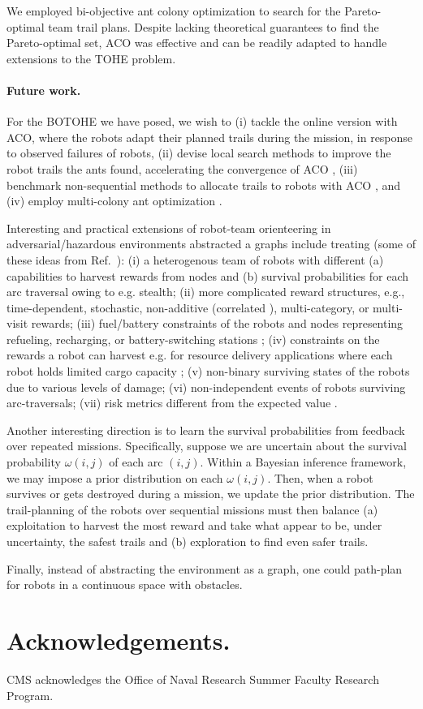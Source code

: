 \documentclass[11pt, oneside]{article}
\begin{document}
We employed bi-objective ant colony optimization to search for the Pareto-optimal team trail plans. Despite lacking theoretical guarantees to find the Pareto-optimal set, ACO was effective and can be readily adapted to handle extensions to the TOHE problem.

\paragraph{Future work.}
For the BOTOHE we have posed, we wish to (i) tackle the online version with ACO, where the robots adapt their planned trails during the mission, in response to observed failures of robots, (ii) devise local search methods to improve the robot trails the ants found, accelerating the convergence of ACO \cite{dorigo2006ant}, (iii) benchmark non-sequential methods to allocate trails to robots with ACO \cite{ke2008ants}, and (iv) employ multi-colony ant optimization \cite{iredi2001bi}.

Interesting and practical extensions of robot-team orienteering in adversarial/hazardous environments abstracted a graphs include treating (some of these ideas from Ref.~\cite{jorgensen2018team}): 
(i) a heterogenous team of robots with different (a) capabilities to harvest rewards from nodes and (b) survival probabilities for each arc traversal owing to e.g. stealth;
(ii) more complicated reward structures, e.g., time-dependent, stochastic, non-additive (correlated \cite{yu2014correlated}), multi-category, or multi-visit rewards;
(iii) fuel/battery constraints of the robots and nodes representing refueling, recharging, or battery-switching stations \cite{asghar2023risk,khuller2011fill,liao2016electric}; 
(iv) constraints on the rewards a robot can harvest e.g. for resource delivery applications where each robot holds limited cargo capacity \cite{coelho2014thirty};
(v) non-binary surviving states of the robots due to various levels of damage;
(vi) non-independent events of robots surviving arc-traversals;
(vii) risk metrics different from the expected value \cite{majumdar2020should}.

Another interesting direction is to learn the survival probabilities from feedback over repeated missions. 
Specifically, suppose we are uncertain about the survival probability $\omega(i, j)$ of each arc $(i,j)$. Within a Bayesian inference framework, we may impose a prior distribution on each $\omega(i,j)$. Then, when a robot survives or gets destroyed during a mission, we update the prior distribution. 
The trail-planning of the robots over sequential missions must then balance (a) exploitation to harvest the most reward and take what appear to be, under uncertainty, the safest trails and (b) exploration to find even safer trails.

Finally, instead of abstracting the environment as a graph, one could path-plan for robots in a continuous space with obstacles. 

\section*{Acknowledgements.} CMS acknowledges the Office of Naval Research Summer Faculty Research Program.



\end{document}
